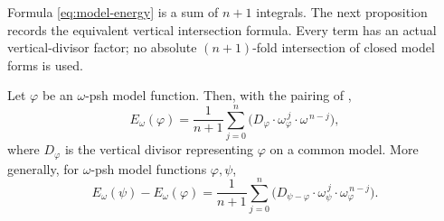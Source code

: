 Formula \eqref{eq:model-energy} is a sum of \(n+1\) integrals.  The next
proposition records the equivalent vertical intersection formula.  Every
term has an actual vertical-divisor factor; no absolute
\((n+1)\)-fold intersection of closed model forms is used.

\begin{proposition}
\label{prop:ch26-energy-intersection}
Let \(\varphi\) be an \(\omega\)-psh model function.  Then, with the pairing
of ,
\begin{equation}
\label{eq:ch26-energy-intersection}
 E_\omega(\varphi)
 =\frac1{n+1}\sum_{j=0}^n
   \bigl(D_\varphi\cdot\omega_\varphi^{\,j}\cdot
                         \omega^{\,n-j}\bigr),
\end{equation}
where \(D_\varphi\) is the vertical divisor representing \(\varphi\) on a
common model.
More generally, for \(\omega\)-psh model functions \(\varphi,\psi\),
\begin{equation}
\label{eq:ch26-energy-difference-intersection}
 E_\omega(\psi)-E_\omega(\varphi)
 =\frac1{n+1}\sum_{j=0}^n
   \bigl(D_{\psi-\varphi}\cdot\omega_\psi^{\,j}\cdot
                         \omega_\varphi^{\,n-j}\bigr).
\end{equation}
\end{proposition}

